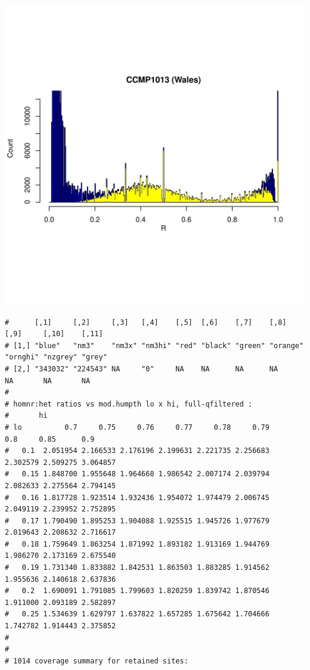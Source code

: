 \documentclass{article}\usepackage[]{graphicx}\usepackage[]{color}
\makeatletter
\def\maxwidth{ %
  \ifdim\Gin@nat@width>\linewidth
    \linewidth
  \else
    \Gin@nat@width
  \fi
}
\newenvironment{kframe}{%
 \def\at@end@of@kframe{}%
 \ifinner\ifhmode%
  \def\at@end@of@kframe{\end{minipage}}%
  \begin{minipage}{\columnwidth}%
 \fi\fi%
 \def\FrameCommand##1{\hskip\@totalleftmargin \hskip-\fboxsep
 \colorbox{shadecolor}{##1}\hskip-\fboxsep
     \hskip-\linewidth \hskip-\@totalleftmargin \hskip\columnwidth}%
 \MakeFramed {\advance\hsize-\width
   \@totalleftmargin\z@ \linewidth\hsize
   \@setminipage}}%
 {\par\unskip\endMakeFramed%
 \at@end@of@kframe}
\newenvironment{knitrout}{}{} %
\makeatother
\begin{document}
\begin{knitrout}
\includegraphics[width=\maxwidth]{FigS7-hwe-histo-figs-knitr/unnamed-chunk-10-33} 
\begin{kframe}\begin{verbatim}
#      [,1]     [,2]     [,3]   [,4]    [,5]  [,6]    [,7]    [,8]     [,9]     [,10]    [,11] 
# [1,] "blue"   "nm3"    "nm3x" "nm3hi" "red" "black" "green" "orange" "ornghi" "nzgrey" "grey"
# [2,] "343032" "224543" NA     "0"     NA    NA      NA      NA       NA       NA       NA
# 
# homnr:het ratios vs mod.humpth lo x hi, full-qfiltered :
#       hi
# lo          0.7     0.75     0.76     0.77     0.78     0.79      0.8     0.85      0.9
#   0.1  2.051954 2.166533 2.176196 2.199631 2.221735 2.256683 2.302579 2.509275 3.064857
#   0.15 1.848700 1.955648 1.964668 1.986542 2.007174 2.039794 2.082633 2.275564 2.794145
#   0.16 1.817728 1.923514 1.932436 1.954072 1.974479 2.006745 2.049119 2.239952 2.752895
#   0.17 1.790490 1.895253 1.904088 1.925515 1.945726 1.977679 2.019643 2.208632 2.716617
#   0.18 1.759649 1.863254 1.871992 1.893182 1.913169 1.944769 1.986270 2.173169 2.675540
#   0.19 1.731340 1.833882 1.842531 1.863503 1.883285 1.914562 1.955636 2.140618 2.637836
#   0.2  1.690091 1.791085 1.799603 1.820259 1.839742 1.870546 1.911000 2.093189 2.582897
#   0.25 1.534639 1.629797 1.637822 1.657285 1.675642 1.704666 1.742782 1.914443 2.375852
# 
# 
# 1014 coverage summary for retained sites:

\end{verbatim}
\end{kframe}
\end{knitrout}
\end{document}
